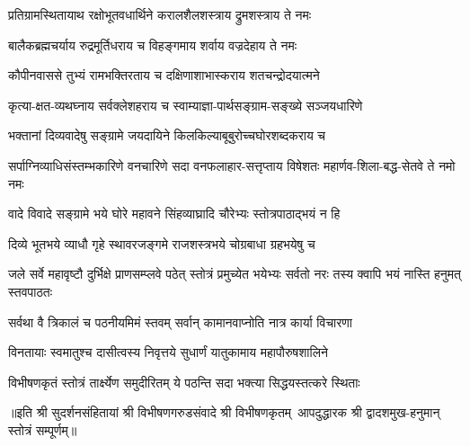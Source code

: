\twolineshloka
{प्रतिग्रामस्थितायाथ रक्षोभूतवधार्थिने}
{करालशैलशस्त्राय द्रुमशस्त्राय ते नमः}

\twolineshloka
{बालैकब्रह्मचर्याय रुद्रमूर्तिधराय च}
{विहङ्गमाय शर्वाय वज्रदेहाय ते नमः}

\twolineshloka
{कौपीनवाससे तुभ्यं रामभक्तिरताय च}
{दक्षिणाशाभास्कराय शतचन्द्रोदयात्मने}

\twolineshloka
{कृत्या-क्षत-व्यथघ्नाय सर्वक्लेशहराय च}
{स्वाम्याज्ञा-पार्थसङ्ग्राम-सङ्ख्ये सञ्जयधारिणे}

\twolineshloka
{भक्तानां दिव्यवादेषु सङ्ग्रामे जयदायिने}
{किलकिल्याबूबुरोच्चघोरशब्दकराय च}

\threelineshloka
{सर्पाग्निव्याधिसंस्तम्भकारिणे वनचारिणे}
{सदा वनफलाहार-सत्तृप्ताय विषेशतः}
{महार्णव-शिला-बद्ध-सेतवे ते नमो नमः}

\twolineshloka
{वादे विवादे सङ्ग्रामे भये घोरे महावने}
{सिंहव्याघ्रादि चौरेभ्यः स्तोत्रपाठाद्भयं न हि}

\twolineshloka
{दिव्ये भूतभये व्याधौ गृहे स्थावरजङ्गमे}
{राजशस्त्रभये चोग्रबाधा ग्रहभयेषु च}

\threelineshloka
{जले सर्वे महावृष्टौ दुर्भिक्षे प्राणसम्प्लवे}
{पठेत् स्तोत्रं प्रमुच्येत भयेभ्यः सर्वतो नरः}
{तस्य क्वापि भयं नास्ति हनुमत् स्तवपाठतः}

\twolineshloka
{सर्वथा वै त्रिकालं च पठनीयमिमं स्तवम्}
{सर्वान् कामानवाप्नोति नात्र कार्या विचारणा}

\twolineshloka
{विनतायाः स्वमातुश्च दासीत्वस्य निवृत्तये}
{सुधार्णं यातुकामाय महापौरुषशालिने}

\twolineshloka
{विभीषणकृतं स्तोत्रं तार्क्ष्येण समुदीरितम्}
{ये पठन्ति सदा भक्त्या सिद्धयस्तत्करे स्थिताः}

॥इति श्री सुदर्शनसंहितायां श्री विभीषणगरुडसंवादे श्री विभीषणकृतम्~आपदुद्धारक श्री द्वादशमुख-हनुमान् स्तोत्रं सम्पूर्णम्॥
